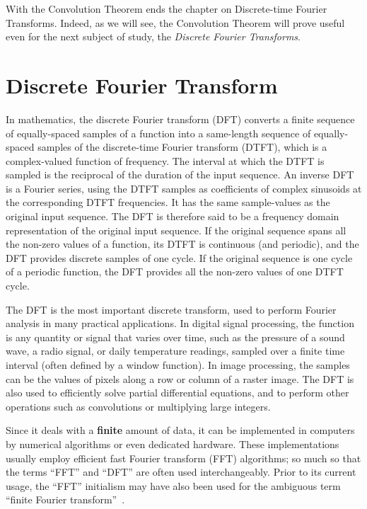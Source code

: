 \documentclass[\documentfontsize, twocolumn]{\classname}
\begin{document}
With the Convolution Theorem ends the chapter on Discrete-time Fourier Transforms. Indeed, as we will see, the Convolution Theorem will prove useful even for the next subject of study, the \emph{Discrete Fourier Transforms}.

\chapter{Discrete Fourier Transform}

In mathematics, the discrete Fourier transform (DFT) converts a finite sequence of equally-spaced samples of a function into a same-length sequence of equally-spaced samples of the discrete-time Fourier transform (DTFT), which is a complex-valued function of frequency. The interval at which the DTFT is sampled is the reciprocal of the duration of the input sequence. An inverse DFT is a Fourier series, using the DTFT samples as coefficients of complex sinusoids at the corresponding DTFT frequencies. It has the same sample-values as the original input sequence. The DFT is therefore said to be a frequency domain representation of the original input sequence. If the original sequence spans all the non-zero values of a function, its DTFT is continuous (and periodic), and the DFT provides discrete samples of one cycle. If the original sequence is one cycle of a periodic function, the DFT provides all the non-zero values of one DTFT cycle.

The DFT is the most important discrete transform, used to perform Fourier analysis in many practical applications. In digital signal processing, the function is any quantity or signal that varies over time, such as the pressure of a sound wave, a radio signal, or daily temperature readings, sampled over a finite time interval (often defined by a window function). In image processing, the samples can be the values of pixels along a row or column of a raster image. The DFT is also used to efficiently solve partial differential equations, and to perform other operations such as convolutions or multiplying large integers.

Since it deals with a \textbf{finite} amount of data, it can be implemented in computers by numerical algorithms or even dedicated hardware. These implementations usually employ efficient fast Fourier transform (FFT) algorithms; so much so that the terms ``FFT'' and ``DFT'' are often used interchangeably. Prior to its current usage, the ``FFT'' initialism may have also been used for the ambiguous term ``finite Fourier transform''~\cite{bib:discreteFourierTransform}.
\end{document}
